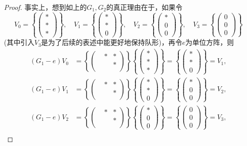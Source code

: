 \begin{enumerate}
\begin{proof}
    事实上，想到如上的$G_1,G_2$的真正理由在于，如果令
    \[V_0=\left\{\begin{pmatrix}*\\*\\*\end{pmatrix}\right\},
    \quad V_1=\left\{\begin{pmatrix}*\\*\\0\end{pmatrix}\right\},
    \quad V_2=\left\{\begin{pmatrix}*\\0\\0\end{pmatrix}\right\},
    \quad V_3=\left\{\begin{pmatrix}0\\0\\0\end{pmatrix}\right\}\]
    (其中引入$V_3$是为了后续的表述中能更好地保持队形)，再令$e$为单位方阵，则
    \begin{align*}
    (G_1-e)V_0&=\left\{\begin{pmatrix} &*&*\\ & &*\\ & & \end{pmatrix}\right\}\left\{\begin{pmatrix}*\\*\\*\end{pmatrix}\right\}=\left\{\begin{pmatrix}*\\*\\0\end{pmatrix}\right\}=V_1,\\
    (G_1-e)V_1&=\left\{\begin{pmatrix} &*&*\\ & &*\\ & & \end{pmatrix}\right\}\left\{\begin{pmatrix}*\\*\\0\end{pmatrix}\right\}=\left\{\begin{pmatrix}*\\0\\0\end{pmatrix}\right\}=V_2,\\
    (G_1-e)V_2&=\left\{\begin{pmatrix} &*&*\\ & &*\\ & & \end{pmatrix}\right\}\left\{\begin{pmatrix}*\\0\\0\end{pmatrix}\right\}=\left\{\begin{pmatrix}0\\0\\0\end{pmatrix}\right\}=V_3,\\

\end{align*}
\end{proof}
\end{enumerate}
